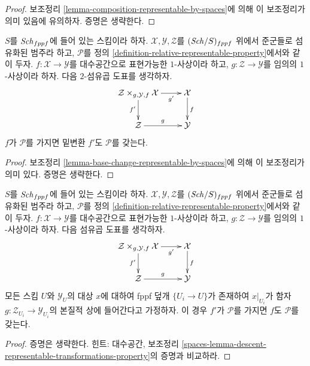 \begin{proof}
보조정리 \ref{lemma-composition-representable-by-spaces}에 의해 이
보조정리가 의미 있음에 유의하자. 증명은 생략한다.
\end{proof}

\begin{lemma}
\label{lemma-base-change-representable-transformations-property}
$S$를 $\mathit{Sch}_{fppf}$에 들어 있는 스킴이라 하자.
$\mathcal{X}, \mathcal{Y}, \mathcal{Z}$를 $(\mathit{Sch}/S)_{fppf}$ 위에서
준군들로 섬유화된 범주라 하고, $\mathcal{P}$를 정의
\ref{definition-relative-representable-property}에서와 같이 두자.
$f : \mathcal{X} \to \mathcal{Y}$를 대수공간으로 표현가능한
$1$-사상이라 하고, $g : \mathcal{Z} \to \mathcal{Y}$를 임의의
$1$-사상이라 하자. 다음 $2$-섬유곱 도표를 생각하자.
$$
\xymatrix{
\mathcal{Z} \times_{g, \mathcal{Y}, f} \mathcal{X} \ar[r]_-{g'} \ar[d]_{f'} &
\mathcal{X} \ar[d]^f \\
\mathcal{Z} \ar[r]^g & \mathcal{Y}
}
$$
$f$가 $\mathcal{P}$를 가지면 밑변환 $f'$도 $\mathcal{P}$를 갖는다.
\end{lemma}

\begin{proof}
보조정리 \ref{lemma-base-change-representable-by-spaces}에 의해 이
보조정리가 의미 있다. 증명은 생략한다.
\end{proof}

\begin{lemma}
\label{lemma-descent-representable-transformations-property}
$S$를 $\mathit{Sch}_{fppf}$에 들어 있는 스킴이라 하자.
$\mathcal{X}, \mathcal{Y}, \mathcal{Z}$를 $(\mathit{Sch}/S)_{fppf}$ 위에서
준군들로 섬유화된 범주라 하고, $\mathcal{P}$를 정의
\ref{definition-relative-representable-property}에서와 같이 두자.
$f : \mathcal{X} \to \mathcal{Y}$를 대수공간으로 표현가능한
$1$-사상이라 하고, $g : \mathcal{Z} \to \mathcal{Y}$를 임의의
$1$-사상이라 하자. 다음 섬유곱 도표를 생각하자.
$$
\xymatrix{
\mathcal{Z} \times_{g, \mathcal{Y}, f} \mathcal{X} \ar[r]_-{g'} \ar[d]_{f'} &
\mathcal{X} \ar[d]^f \\
\mathcal{Z} \ar[r]^g & \mathcal{Y}
}
$$
모든 스킴 $U$와 $\mathcal{Y}_U$의 대상 $x$에 대하여 fppf 덮개
$\{U_i \to U\}$가 존재하여 $x|_{U_i}$가 함자
$g : \mathcal{Z}_{U_i} \to \mathcal{Y}_{U_i}$의 본질적 상에 들어간다고
가정하자. 이 경우 $f'$가 $\mathcal{P}$를 가지면 $f$도
$\mathcal{P}$를 갖는다.
\end{lemma}

\begin{proof}
증명은 생략한다. 힌트: 대수공간, 보조정리
\ref{spaces-lemma-descent-representable-transformations-property}의 증명과
비교하라.
\end{proof}


